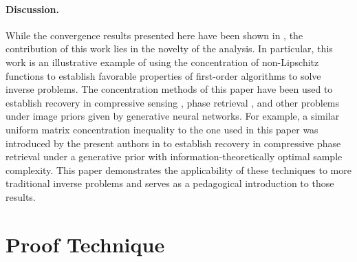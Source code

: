 \documentclass[11pt]{article}
\begin{document}
\paragraph{Discussion.} While the convergence results presented here have been shown in \cite{AmpFlow}, the contribution of this work lies in the novelty of the analysis. In particular, this work is an illustrative example of using the concentration of non-Lipschitz functions to establish favorable properties of first-order algorithms to solve inverse problems. The concentration methods of this paper have been used to establish recovery in compressive sensing \cite{HV2017, Huangetal2018}, phase retrieval \cite{HLV18, HLV20}, and other problems \cite{Heckeletal2018, Qiuetal19, JoshiHand19, CHV20} under image priors given by generative neural networks. For example, a similar uniform matrix concentration inequality to the one used in this paper was introduced by the present authors in \cite{HLV18, HLV20} to establish recovery in compressive phase retrieval under a generative prior with information-theoretically optimal sample complexity.  This paper demonstrates the applicability of these techniques to more traditional inverse problems and serves as a pedagogical introduction to those results.
 


\section{Proof Technique}
\end{document}
